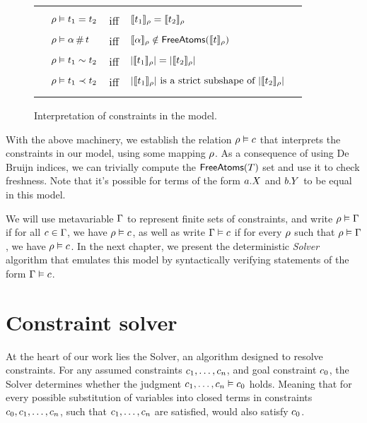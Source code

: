 \documentclass[english, mgr]{iithesis}
\renewcommand{\it}[1]{\textit{#1}}
\begin{document}
\begin{figure}[htbp]
  \centering
    \begin{tabularx}{\textwidth}{|XlclX|}
      \hline & & & & \\
      & $\rho \vDash t_1 = t_2 $  & \textrm{iff} &
        $\llbracket t_1 \rrbracket_{\rho} = \llbracket t_2 \rrbracket_{\rho}$ & \\
      & $\rho \vDash \alpha \,\#\, t$ & \textrm{iff} &
        $\llbracket \alpha \rrbracket_{\rho} \notin
          \mathsf{FreeAtoms}(\llbracket t \rrbracket_{\rho})$ & \\
      & $\rho \vDash t_1 \sim t_2$ & \textrm{iff} &
        $|\llbracket t_1 \rrbracket_{\rho}| = |\llbracket t_2 \rrbracket_{\rho}|$ & \\
      & $\rho \vDash t_1 \prec t_2$ & \textrm{iff} &
        $|\llbracket t_1 \rrbracket_{\rho}| \textrm{ is a strict subshape of }
          |\llbracket t_2 \rrbracket_{\rho}|$ & \\
      & & & & \\ \hline
    \end{tabularx}
  \caption{Interpretation of constraints in the model.}
  \label{fig:constraint-interpretation}
\end{figure}
With the above machinery, we establish the relation $\rho \vDash c$
that interprets the constraints in our model, using some mapping $\rho$.
As a consequence of using De Bruijn indices, we can trivially compute the
$\mathsf{FreeAtoms}(T)$ set and use it to check freshness.
Note that it's possible for terms of the form $a.{X}$ and $b.{Y}$
to be equal in this model.

\pagebreak

We will use metavariable $\Gamma$ to represent finite sets of constraints,
and write $\rho \vDash \Gamma$ if for all $c \in \Gamma$,
we have $\rho \vDash c$,
as well as write $\Gamma \vDash c$ if for every $\rho$ such that $\rho \vDash \Gamma$,
we have $\rho \vDash c$.
In the next chapter, we present the deterministic \it{Solver} algorithm
that emulates this model by syntactically verifying statements of the form $\Gamma \vDash c$.

\chapter{Constraint solver} \label{sec:solver}
At the heart of our work lies the Solver, an algorithm designed to resolve constraints.
For any assumed constraints $c_1, \dots, c_n$, and
goal constraint $c_0$, the Solver determines whether the judgment $c_1, \dots, c_n \vDash c_0$ holds.
Meaning that for every possible substitution of variables into closed terms in constraints $c_0, c_1, \dots, c_n$,
such that $c_1, \dots, c_n$ are satisfied, would also satisfy $c_0$.
\end{document}
